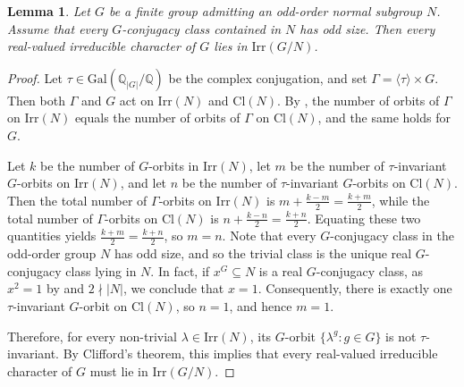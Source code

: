 \documentclass[10pt]{article}
\newtheorem{lem}{\bf Lemma}[section]
\begin{document}
\begin{lem}\label{lem: all real in G/N}
  Let $G$ be a finite group admitting an odd-order normal subgroup $N$.
  Assume that every $G$-conjugacy class contained in $N$ has odd size.
  Then every real-valued irreducible character of $G$ lies in $\mathrm{Irr}(G/N)$.
\end{lem}
\begin{proof}
  Let $\tau\in \mathrm{Gal}(\mathbb{Q}_{|G|}/\mathbb{Q})$ be the complex conjugation,
  and set $\Gamma=\langle \tau\rangle \times G$.
  Then both $\Gamma$ and $G$ act on $\mathrm{Irr}(N)$ and $\mathrm{Cl}(N)$.
  By \cite[Corollary 6.33]{isaacs76}, the number of orbits of $\Gamma$ on $\mathrm{Irr}(N)$ 
   equals the number of orbits of $\Gamma$ on $\mathrm{Cl}(N)$, and the same holds for $G$.
  
  

  Let $k$ be the number of $G$-orbits in $\mathrm{Irr}(N)$, let $m$ be the number of $\tau$-invariant $G$-orbits on $\mathrm{Irr}(N)$, and let $n$ be the number of $\tau$-invariant $G$-orbits on $\mathrm{Cl}(N)$.
  Then the total number of $\Gamma$-orbits on $\mathrm{Irr}(N)$ is $m+\frac{k-m}{2}=\frac{k+m}{2}$,
  while the total number of $\Gamma$-orbits on $\mathrm{Cl}(N)$ is $n+\frac{k-n}{2}=\frac{k+n}{2}$.
  Equating these two quantities yields $\frac{k+m}{2} = \frac{k+n}{2}$, so $m = n$.
  Note that every $G$-conjugacy class in the odd-order group $N$ has odd size, and so the trivial class is the unique real $G$-conjugacy class lying in $N$.
  In fact, if $x^G \subseteq N$ is a real $G$-conjugacy class,
   as $x^{2}=1$ by \cite[Lemma 2.4(i)]{dolfi10} and $2\nmid |N|$,
   we conclude that $x=1$.
   Consequently, there is exactly one $\tau$-invariant $G$-orbit on $\mathrm{Cl}(N)$, 
so $n = 1$, and hence $m = 1$.
  
Therefore, for every non-trivial $\lambda\in \mathrm{Irr}(N)$,
  its $G$-orbit $\{ \lambda^g:g\in G \}$ is not $\tau$-invariant.
  By Clifford's theorem, this implies that every real-valued irreducible character of $G$ must lie in $\mathrm{Irr}(G/N)$.
\end{proof}
\end{document}
